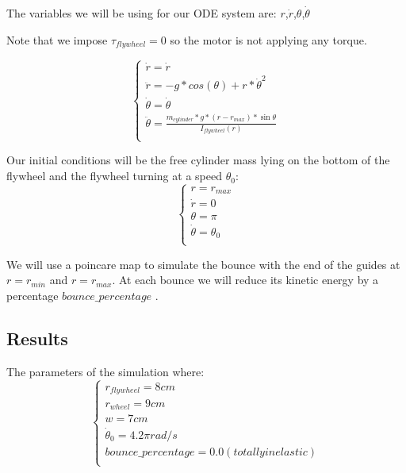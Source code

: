 The variables we will be using for our ODE system are: $r$,$\dot{r}$,$\theta$,$\dot{\theta}$

Note that we impose $\tau_{flywheel} = 0$ so the motor is not applying any torque.

\[
\begin{cases}
    \dot{r} = \dot{r}\\
    \ddot{r} = -g * cos(\theta) + r * \dot{\theta}^2\\
    \dot{\theta} = \dot{\theta}\\
    \ddot{\theta} = \frac{m_{cylinder} * g * (r - r_{max}) * \sin{\theta}}{I_{flywheel}(r)} \\    
\end{cases}
\]


Our initial conditions will be the free cylinder mass lying on the bottom of the flywheel and the flywheel turning at a speed $\theta_0$:
\[
    \begin{cases}
        r = r_{max} \\
        \dot{r} = 0\\
        \theta = \pi\\
        \dot{\theta} = \theta_0\\
    \end{cases}
\]

We will use a poincare map to simulate the bounce with the end of the guides at $r=r_{min}$ and $r=r_{max}$. At each bounce we will reduce its kinetic energy by a percentage $bounce\_percentage$ .

\subsection{Results}
The parameters of the simulation where:
\[
\begin{cases}
	r_{flywheel} = 8cm \\
	r_{wheel} = 9cm \\
	w = 7 cm \\
	\dot{\theta}_0 = 4.2 \pi rad/s \\
	bounce\_percentage = 0.0 (totally inelastic) \\	
\end{cases}	
\]

